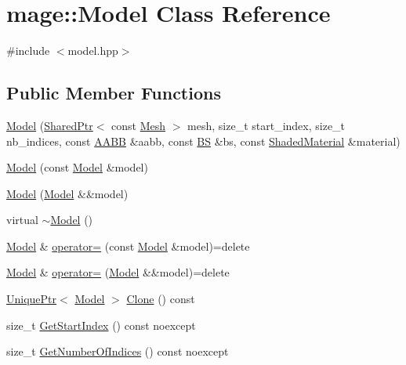 \hypertarget{classmage_1_1_model}{}\section{mage\+:\+:Model Class Reference}
\label{classmage_1_1_model}


{\ttfamily \#include $<$model.\+hpp$>$}

\subsection*{Public Member Functions}
\begin{DoxyCompactItemize}
\item 
\hyperlink{classmage_1_1_model_add9b05c4ca824c116f4ac0759eb62ef7}{Model} (\hyperlink{namespacemage_a1e01ae66713838a7a67d30e44c67703e}{Shared\+Ptr}$<$ const \hyperlink{classmage_1_1_mesh}{Mesh} $>$ mesh, size\+\_\+t start\+\_\+index, size\+\_\+t nb\+\_\+indices, const \hyperlink{structmage_1_1_a_a_b_b}{A\+A\+BB} \&aabb, const \hyperlink{structmage_1_1_b_s}{BS} \&bs, const \hyperlink{structmage_1_1_shaded_material}{Shaded\+Material} \&material)
\item 
\hyperlink{classmage_1_1_model_ac5f1d340bbfefd30bec3e6343a86059a}{Model} (const \hyperlink{classmage_1_1_model}{Model} \&model)
\item 
\hyperlink{classmage_1_1_model_a71abc57cde3bd6270de88bfa3aa47601}{Model} (\hyperlink{classmage_1_1_model}{Model} \&\&model)
\item 
virtual \hyperlink{classmage_1_1_model_af9f45ed2dcf470f85bbfd144ca9857a7}{$\sim$\+Model} ()
\item 
\hyperlink{classmage_1_1_model}{Model} \& \hyperlink{classmage_1_1_model_a563515c64ec39cfcda9f6ca37576391b}{operator=} (const \hyperlink{classmage_1_1_model}{Model} \&model)=delete
\item 
\hyperlink{classmage_1_1_model}{Model} \& \hyperlink{classmage_1_1_model_a084e30d15822bfefa79128f30a57cc02}{operator=} (\hyperlink{classmage_1_1_model}{Model} \&\&model)=delete
\item 
\hyperlink{namespacemage_a8c307fbcc33bce9b7f2aa4c26c3b95cf}{Unique\+Ptr}$<$ \hyperlink{classmage_1_1_model}{Model} $>$ \hyperlink{classmage_1_1_model_a39d5f0b2b83729a68569072d69113ed7}{Clone} () const
\item 
size\+\_\+t \hyperlink{classmage_1_1_model_a876fcfe369f12e2d7edb6b533dd06252}{Get\+Start\+Index} () const noexcept
\item 
size\+\_\+t \hyperlink{classmage_1_1_model_a37c9814a445159fd742bcc1b9a5a7b94}{Get\+Number\+Of\+Indices} () const noexcept

\end{DoxyCompactItemize}
